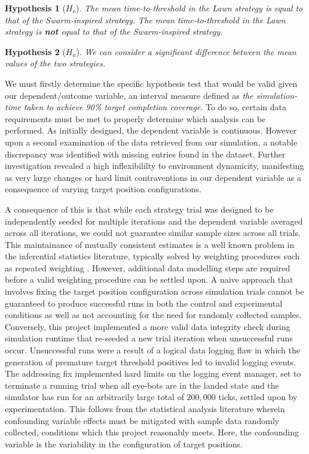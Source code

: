 \documentclass{report}
\newtheorem*{hyp}{Hypothesis}
\begin{document}
\begin{hyp}[$H_o$]\label{hyp:null2}
	The mean time-to-threshold in the Lawn strategy is equal to that of the Swarm-inspired strategy.
	The mean time-to-threshold in the Lawn strategy is \textbf{not} equal to that of the Swarm-inspired strategy.
\end{hyp}
	
\begin{hyp}[$H_a$]\label{hyp:alt2}
	We can consider a significant difference between the mean values of the two strategies.
\end{hyp}

 We must firstly determine the specific hypothesis test that would be valid given our dependent/outcome variable, an interval measure defined as \textit{the simulation-time taken to achieve 90\% target completion coverage}. To do so, certain data requirements must be met to properly determine which analysis can be performed. As initially designed, the dependent variable is continuous. However upon a second examination of the data retrieved from our simulation, a notable discrepancy was identified with missing entries found in the dataset. Further investigation revealed a high inflexibililty to environment dynamicity, manifesting as very large changes or hard limit contraventions in our dependent variable as a consequence of varying target position configurations.

 A consequence of this is that while each strategy trial was designed to be independently seeded for multiple iterations and the dependent variable averaged across all iterations, we could not guarantee similar sample sizes across all trials. This maintainance of mutually consistent estimates is a well known problem in the inferential statistics literature, typically solved by weighting procedures \cite{Kalton2003} \cite{Boonstra2004} such as repeated weighting \cite{Renssen2001}. However, additional data modelling steps are required before a valid weighting procedure can be settled upon. A naive approach that involves fixing the target position configuration across simulation trials cannot be guaranteed to produce successful runs in both the control and experimental conditions as well as not accounting for the need for randomly collected samples. Conversely, this project implemented a more valid data integrity check during simulation runtime that re-seeded a new trial iteration when unsuccessful runs occur. Unsuccessful runs were a result of a logical data logging flaw in which the generation of premature target threshold positives led to invalid logging events. The addressing fix implemented hard limits on the logging event manager, set to terminate a running trial when all eye-bots are in the landed state and the simulator has run for an arbitrarily large total of $200,000$ ticks, settled upon by experimentation. This follows from the statistical analysis literature wherein confounding variable effects must be mitigated with sample data randomly collected, conditions which this project reasonably meets. Here, the confounding variable is the variability in the configuration of target positions.
\end{document}
